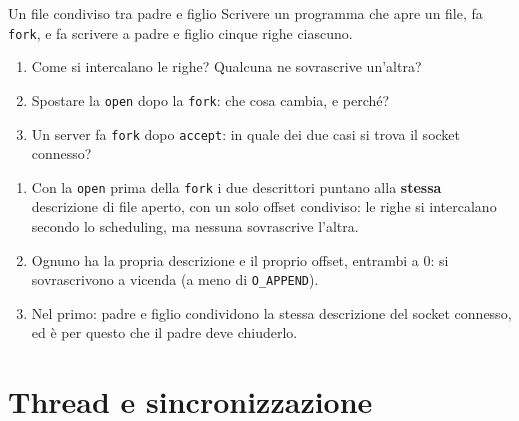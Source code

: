 \begin{esercizio}{Un file condiviso tra padre e figlio}
Scrivere un programma che apre un file, fa \texttt{fork}, e fa scrivere a padre e figlio cinque righe ciascuno.
\begin{enumerate}[label=(\alph*)]
    \item Come si intercalano le righe? Qualcuna ne sovrascrive un'altra?
    \item Spostare la \texttt{open} dopo la \texttt{fork}: che cosa cambia, e perché?
    \item Un server fa \texttt{fork} dopo \texttt{accept}: in quale dei due casi si trova il socket connesso?
\end{enumerate}

\svolgimento
\begin{enumerate}[label=(\alph*)]
    \item Con la \texttt{open} prima della \texttt{fork} i due descrittori puntano alla \textbf{stessa} descrizione di file aperto, con un
          solo offset condiviso: le righe si intercalano secondo lo scheduling, ma nessuna sovrascrive l'altra.
    \item Ognuno ha la propria descrizione e il proprio offset, entrambi a 0: si sovrascrivono a vicenda (a meno di \texttt{O\_APPEND}).
    \item Nel primo: padre e figlio condividono la stessa descrizione del socket connesso, ed è per questo che il padre deve chiuderlo.
\end{enumerate}
\end{esercizio}

\section{Thread e sincronizzazione}

